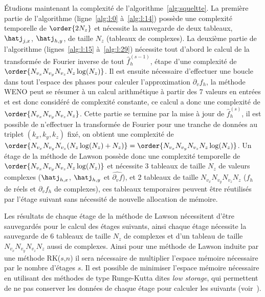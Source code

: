 Étudions maintenant la complexité de l'algorithme~\ref{alg:squeltte}. La première partie de l'algorithme (ligne~\ref{alg:l:0} à~\ref{alg:l:14}) possède une complexité temporelle de $\order{2N_z}$ et nécessite la sauvegarde de deux tableaux, $\hatj_{j,x}$, $\hatj_{h,y}$, de taille $N_z$ (tableaux de complexes). La deuxième partie de l'algorithme (lignes~\ref{alg:l:15} à~\ref{alg:l:29}) nécessite tout d'abord le calcul de la transformée de Fourier inverse de tout $\hat{f}_h^{(s-1)}$, étape d'une complexité de $\order{N_{v_x}N_{v_y}N_{v_z}N_z\log(N_z)}$. Il est ensuite nécessaire d'effectuer une boucle dans tout l'espace des phases pour calculer l'approximation $\partial_vf_h$, la méthode WENO peut se résumer à un calcul arithmétique à partir des 7 valeurs en entrées et est donc considéré de complexité constante, ce calcul a donc une complexité de $\order{N_{v_x}N_{v_y}N_{v_z}N_z}$. Cette partie se termine par la mise à jour de $\hat{f}_h^{(s)}$, il est possible de n'effectuer la transformée de Fourier pour une tranche de données au triplet $(k_x,k_y,k_z)$ fixé, on obtient une complexité de $\order{N_{v_x}N_{v_y}N_{v_z}(N_z\log(N_z)+N_z)} = \order{N_{v_x}N_{v_y}N_{v_z}N_z\log(N_z)}$. Un étage de la méthode de Lawson possède donc une complexité temporelle de $\order{N_{v_x}N_{v_y}N_{v_z}N_z\log(N_z)}$ et nécessite 3 tableaux de taille $N_z$ de valeurs complexes ($\hatj_{h,x}$, $\hatj_{h,y}$ et $\widehat{\partial_vf}$), et 2 tableaux de taille $N_{v_x}N_{v_y}N_{v_z}N_z$ ($f_h$ de réels et $\partial_vf_h$ de complexes), ces tableaux temporaires peuvent être réutilisés par l'étage suivant sans nécessité de nouvelle allocation de mémoire.

Les résultats de chaque étage de la méthode de Lawson nécessitent d'être sauvegardés pour le calcul des étages suivants, ainsi chaque étage nécessite la sauvegarde de 6 tableaux de taille $N_z$ de complexes et d'un tableau de taille $N_{v_x}N_{v_y}N_{v_z}N_z$ aussi de complexes. Ainsi pour une méthode de Lawson induite par une méthode RK($s$,$n$) il sera nécessaire de multiplier l'espace mémoire nécessaire par le nombre d'étages $s$. Il est possible de minimiser l'espace mémoire nécessaire en utilisant des méthodes de type Runge-Kutta dites \emph{low storage}, qui permettent de ne pas conserver les données de chaque étage pour calculer les suivants (voir~\cite{Ketcheson:2015}).

